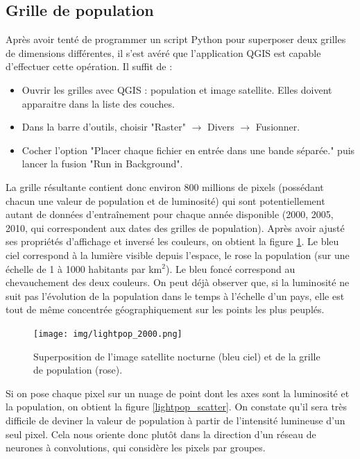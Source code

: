 \documentclass[a4paper, 11pt]{report}
\begin{document}
\subsection{Grille de population}

Après avoir tenté de programmer un script Python pour superposer deux grilles de dimensions différentes, il s'est avéré que l'application QGIS est capable d'effectuer cette opération. Il suffit de :

\begin{itemize}
	\item Ouvrir les grilles avec QGIS : population et image satellite. Elles doivent apparaitre dans la liste des couches.
	\item Dans la barre d'outils, choisir "Raster" $\rightarrow$ Divers $\rightarrow$ Fusionner.
	\item Cocher l'option "Placer chaque fichier en entrée dans une bande séparée." puis lancer la fusion "Run in Background".
\end{itemize}

La grille résultante contient donc environ 800 millions de pixels (possédant chacun une valeur de population et de luminosité) qui sont potentiellement autant de données d'entraînement pour chaque année disponible (2000, 2005, 2010, qui correspondent aux dates des grilles de population). Après avoir ajusté ses propriétés d'affichage et inversé les couleurs, on obtient la figure \ref{lightpop_2000}. Le bleu ciel correspond à la lumière visible depuis l'espace, le rose la population (sur une échelle de 1 à 1000 habitants par km$^2$). Le bleu foncé correspond au chevauchement des deux couleurs. On peut déjà observer que, si la luminosité ne suit pas l'évolution de la population dans le temps à l'échelle d'un pays, elle est tout de même concentrée géographiquement sur les points les plus peuplés.

\begin{figure}
	\centering
	\texttt{[image: img/lightpop\_2000.png]}
	\caption{Superposition de l'image satellite nocturne (bleu ciel) et de la grille de population (rose).}
	\label{lightpop_2000}
\end{figure}

Si on pose chaque pixel sur un nuage de point dont les axes sont la luminosité et la population, on obtient la figure \ref{lightpop_scatter}. On constate qu'il sera très difficile de deviner la valeur de population à partir de l'intensité lumineuse d'un seul pixel. Cela nous oriente donc plutôt dans la direction d'un réseau de neurones à convolutions, qui considère les pixels par groupes.
\end{document}
